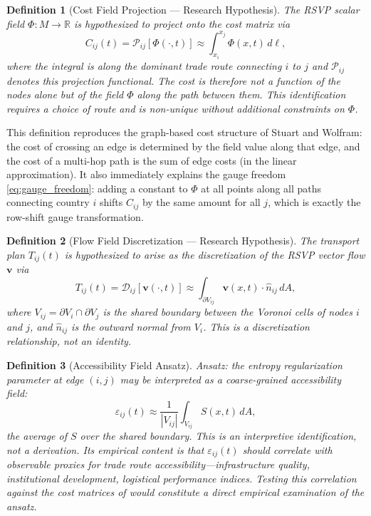 \documentclass[12pt]{article}
\newtheorem{definition}{Definition}[section]
\newcommand{\Tij}{T_{ij}}
\newcommand{\Cij}{C_{ij}}
\newcommand{\eps}{\varepsilon}
\begin{document}
\begin{definition}[Cost Field Projection --- Research Hypothesis]
The RSVP scalar field $\Phi: M \to \mathbb{R}$ is hypothesized to project onto the cost matrix via
\begin{equation}
\Cij(t) = \mathcal{P}_{ij}[\Phi(\cdot,t)] \approx \int_{x_i}^{x_j} \Phi(x, t)\, d\ell,
\label{eq:cost_from_phi}
\end{equation}
where the integral is along the dominant trade route connecting $i$ to $j$ and $\mathcal{P}_{ij}$ denotes this projection functional. The cost is therefore not a function of the nodes alone but of the field $\Phi$ along the path between them. This identification requires a choice of route and is non-unique without additional constraints on $\Phi$.
\end{definition}

This definition reproduces the graph-based cost structure of Stuart and Wolfram: the cost of crossing an edge is determined by the field value along that edge, and the cost of a multi-hop path is the sum of edge costs (in the linear approximation). It also immediately explains the gauge freedom \eqref{eq:gauge_freedom}: adding a constant to $\Phi$ at all points along all paths connecting country $i$ shifts $C_{ij}$ by the same amount for all $j$, which is exactly the row-shift gauge transformation.

\begin{definition}[Flow Field Discretization --- Research Hypothesis]
The transport plan $T_{ij}(t)$ is hypothesized to arise as the discretization of the RSVP vector flow $\mathbf{v}$ via
\begin{equation}
\Tij(t) = \mathcal{D}_{ij}[\mathbf{v}(\cdot,t)] \approx \int_{\partial V_{ij}} \mathbf{v}(x, t) \cdot \hat{n}_{ij}\, dA,
\label{eq:flow_from_v}
\end{equation}
where $V_{ij} = \partial V_i \cap \partial V_j$ is the shared boundary between the Voronoi cells of nodes $i$ and $j$, and $\hat{n}_{ij}$ is the outward normal from $V_i$. This is a discretization relationship, not an identity.
\end{definition}

\begin{definition}[Accessibility Field Ansatz]
\textit{Ansatz:} the entropy regularization parameter at edge $(i,j)$ may be interpreted as a coarse-grained accessibility field:
\begin{equation}
\eps_{ij}(t) \approx \frac{1}{|V_{ij}|}\int_{V_{ij}} S(x, t)\, dA,
\label{eq:eps_from_S}
\end{equation}
the average of $S$ over the shared boundary. This is an interpretive identification, not a derivation. Its empirical content is that $\eps_{ij}(t)$ should correlate with observable proxies for trade route accessibility---infrastructure quality, institutional development, logistical performance indices. Testing this correlation against the cost matrices of \citet{gaskin2026} would constitute a direct empirical examination of the ansatz.
\end{definition}
\end{document}

